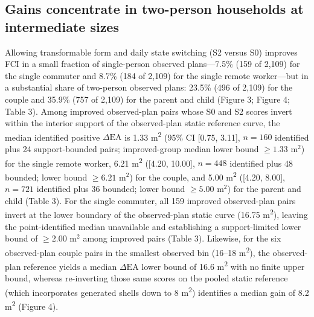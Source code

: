 \documentclass[12pt,letterpaper]{article}
\begin{document}
\subsection{Gains concentrate in two-person households at intermediate sizes}\label{gains-concentrate-in-two-person-households-at-intermediate-sizes}

Allowing transformable form and daily state switching (S2 versus S0) improves FCI in a small fraction of single-person observed plans---7.5\% (159 of 2,109) for the single commuter and 8.7\% (184 of 2,109) for the single remote worker---but in a substantial share of two-person observed plans: 23.5\% (496 of 2,109) for the couple and 35.9\% (757 of 2,109) for the parent and child (Figure 3; Figure 4; Table 3). Among improved observed-plan pairs whose S0 and S2 scores invert within the interior support of the observed-plan static reference curve, the median identified positive \(\Delta\text{EA}\) is 1.33 m\textsuperscript{2} (95\% CI {[}0.75, 3.11{]}, \(n = 160\) identified plus 24 support-bounded pairs; improved-group median lower bound \(\ge 1.33\text{ m}^2\)) for the single remote worker, 6.21 m\textsuperscript{2} ({[}4.20, 10.00{]}, \(n = 448\) identified plus 48 bounded; lower bound \(\ge 6.21\text{ m}^2\)) for the couple, and 5.00 m\textsuperscript{2} ({[}4.20, 8.00{]}, \(n = 721\) identified plus 36 bounded; lower bound \(\ge 5.00\text{ m}^2\)) for the parent and child (Table 3). For the single commuter, all 159 improved observed-plan pairs invert at the lower boundary of the observed-plan static curve (16.75 m\textsuperscript{2}), leaving the point-identified median unavailable and establishing a support-limited lower bound of \(\ge 2.00\text{ m}^2\) among improved pairs (Table 3). Likewise, for the six observed-plan couple pairs in the smallest observed bin (16--18 m\textsuperscript{2}), the observed-plan reference yields a median \(\Delta\text{EA}\) lower bound of 16.6 m\textsuperscript{2} with no finite upper bound, whereas re-inverting those same scores on the pooled static reference (which incorporates generated shells down to 8 m\textsuperscript{2}) identifies a median gain of 8.2 m\textsuperscript{2} (Figure 4).
\end{document}
